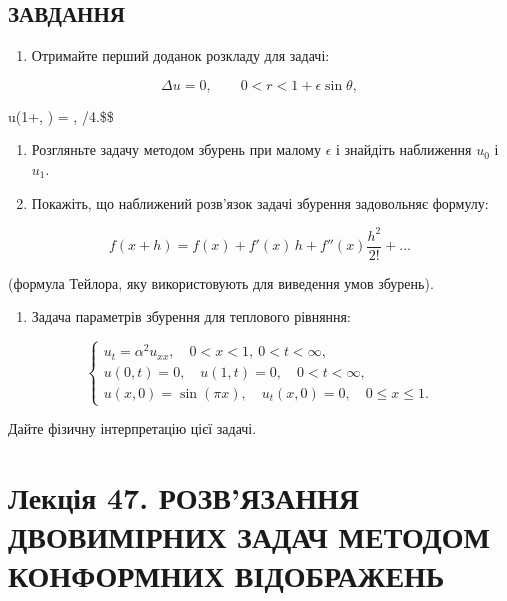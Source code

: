 \documentclass[
  ukrainian,
]{article}
\providecommand{\tightlist}{%
  \setlength{\itemsep}{0pt}\setlength{\parskip}{0pt}}
\begin{document}
\subsection{ЗАВДАННЯ}\label{ux437ux430ux432ux434ux430ux43dux43dux44f-3}

\begin{enumerate}
\def\labelenumi{\arabic{enumi}.}
\tightlist
\item
  Отримайте перший доданок розкладу для задачі:
\end{enumerate}

\[
\Delta u = 0, \qquad 0 < r < 1 + \epsilon\sin\theta,
\]

u(1+\epsilon\sin\theta, \theta) = \cos\theta, 
\le \epsilon {}/4.\$\$

\begin{enumerate}
\def\labelenumi{\arabic{enumi}.}
\setcounter{enumi}{1}
\item
  Розгляньте задачу методом збурень при малому \(\epsilon\) і знайдіть
  наближення \(u_0\) і \(u_1\).
\item
  Покажіть, що наближений розв'язок задачі збурення задовольняє формулу:
\end{enumerate}

\[
f(x+h) = f(x) + f'(x)\,h + f''(x)\frac{h^2}{2!} + \dots
\]

(формула Тейлора, яку використовують для виведення умов збурень).

\begin{enumerate}
\def\labelenumi{\arabic{enumi}.}
\setcounter{enumi}{3}
\tightlist
\item
  Задача параметрів збурення для теплового рівняння:
\end{enumerate}

\[
\begin{cases}u_t = \alpha^2 u_{xx}, \quad 0 < x < 1,\ 0 < t < \infty, \\u(0,t) = 0, \quad u(1,t) = 0, \quad 0 < t < \infty, \\u(x,0) = \sin(\pi x), \quad u_t(x,0) = 0, \quad 0 \le x \le 1.\end{cases}
\]

Дайте фізичну інтерпретацію цієї задачі.

\section{Лекція 47. РОЗВ'ЯЗАННЯ ДВОВИМІРНИХ ЗАДАЧ МЕТОДОМ КОНФОРМНИХ
ВІДОБРАЖЕНЬ}\label{ux43bux435ux43aux446ux456ux44f-47.-ux440ux43eux437ux432ux44fux437ux430ux43dux43dux44f-ux434ux432ux43eux432ux438ux43cux456ux440ux43dux438ux445-ux437ux430ux434ux430ux447-ux43cux435ux442ux43eux434ux43eux43c-ux43aux43eux43dux444ux43eux440ux43cux43dux438ux445-ux432ux456ux434ux43eux431ux440ux430ux436ux435ux43dux44c}
\end{document}
